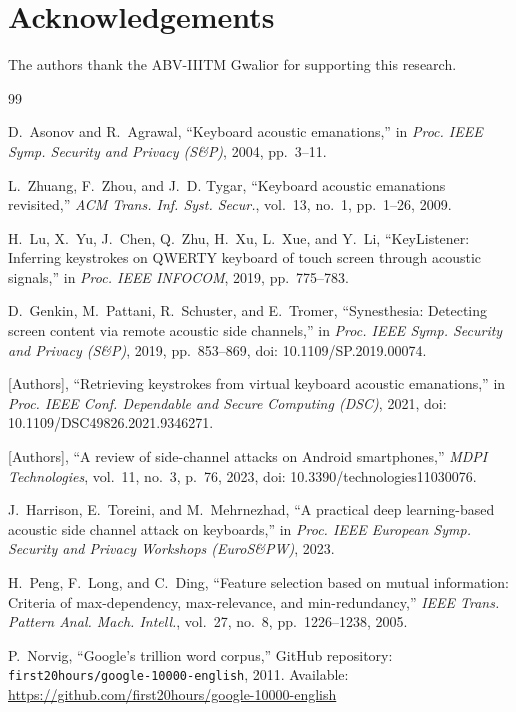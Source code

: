 \documentclass[conference]{IEEEtran}
\begin{document}
\section*{Acknowledgements}
The authors thank the ABV-IIITM Gwalior for supporting this research.

\begin{thebibliography}{99}

D.~Asonov and R.~Agrawal,
``Keyboard acoustic emanations,''
in \textit{Proc. IEEE Symp. Security and Privacy (S\&P)}, 2004, pp.~3--11.

L.~Zhuang, F.~Zhou, and J.~D. Tygar,
``Keyboard acoustic emanations revisited,''
\textit{ACM Trans. Inf. Syst. Secur.}, vol.~13, no.~1, pp.~1--26, 2009.

H.~Lu, X.~Yu, J.~Chen, Q.~Zhu, H.~Xu, L.~Xue, and Y.~Li,
``KeyListener: Inferring keystrokes on QWERTY keyboard of touch screen through acoustic signals,''
in \textit{Proc. IEEE INFOCOM}, 2019, pp.~775--783.

D.~Genkin, M.~Pattani, R.~Schuster, and E.~Tromer,
``Synesthesia: Detecting screen content via remote acoustic side channels,''
in \textit{Proc. IEEE Symp. Security and Privacy (S\&P)}, 2019, pp.~853--869,
doi: 10.1109/SP.2019.00074.

[Authors],
``Retrieving keystrokes from virtual keyboard acoustic emanations,''
in \textit{Proc. IEEE Conf. Dependable and Secure Computing (DSC)}, 2021,
doi: 10.1109/DSC49826.2021.9346271.

[Authors],
``A review of side-channel attacks on Android smartphones,''
\textit{MDPI Technologies}, vol.~11, no.~3, p.~76, 2023,
doi: 10.3390/technologies11030076.

J.~Harrison, E.~Toreini, and M.~Mehrnezhad,
``A practical deep learning-based acoustic side channel attack on keyboards,''
in \textit{Proc. IEEE European Symp. Security and Privacy Workshops (EuroS\&PW)}, 2023.

H.~Peng, F.~Long, and C.~Ding,
``Feature selection based on mutual information: Criteria of max-dependency, max-relevance, and min-redundancy,''
\textit{IEEE Trans. Pattern Anal. Mach. Intell.}, vol.~27, no.~8, pp.~1226--1238, 2005.

P.~Norvig,
``Google's trillion word corpus,''
GitHub repository: \texttt{first20hours/google-10000-english}, 2011.
Available: \url{https://github.com/first20hours/google-10000-english}

\end{thebibliography}
\end{document}
